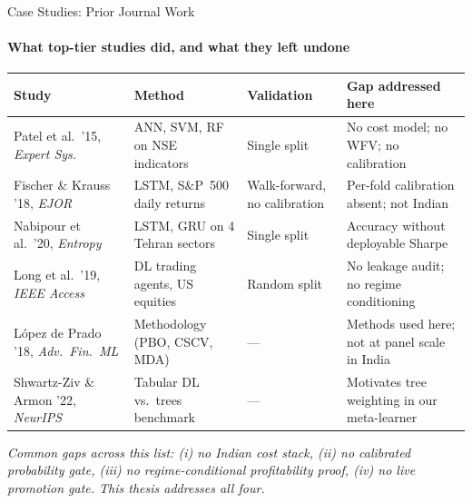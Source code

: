 \documentclass[10pt,aspectratio=43]{beamer}
\newcommand{\vsep}{\vspace{0.04cm}}
\newcommand{\AS}{\renewcommand{\arraystretch}{1.15}}
\begin{document}
\begin{frame}{Case Studies: Prior Journal Work}
  \framesubtitle{What top-tier studies did, and what they left undone}
  \AS\scriptsize
  \begin{tabular}{@{}p{2.6cm} p{2.4cm} p{2.0cm} p{3.4cm}@{}}
    \toprule
    \textbf{Study} & \textbf{Method} & \textbf{Validation} & \textbf{Gap addressed here} \\
    \midrule
    Patel et al.\ '15, \textit{Expert Sys.} & ANN, SVM, RF on NSE indicators & Single split & No cost model; no WFV; no calibration \\
    Fischer \& Krauss '18, \textit{EJOR} & LSTM, S\&P~500 daily returns & Walk-forward, no calibration & Per-fold calibration absent; not Indian \\
    Nabipour et al.\ '20, \textit{Entropy} & LSTM, GRU on 4 Tehran sectors & Single split & Accuracy without deployable Sharpe \\
    Long et al.\ '19, \textit{IEEE Access} & DL trading agents, US equities & Random split & No leakage audit; no regime conditioning \\
    L\'opez de Prado '18, \textit{Adv.\ Fin.\ ML} & Methodology (PBO, CSCV, MDA) & --- & Methods used here; not at panel scale in India \\
    Shwartz-Ziv \& Armon '22, \textit{NeurIPS} & Tabular DL vs.\ trees benchmark & --- & Motivates tree weighting in our meta-learner \\
    \bottomrule
  \end{tabular}
  \vsep
  {\footnotesize\textit{Common gaps across this list: (i) no Indian cost stack, (ii) no calibrated probability gate, (iii) no regime-conditional profitability proof, (iv) no live promotion gate. This thesis addresses all four.}}
\end{frame}
\end{document}

